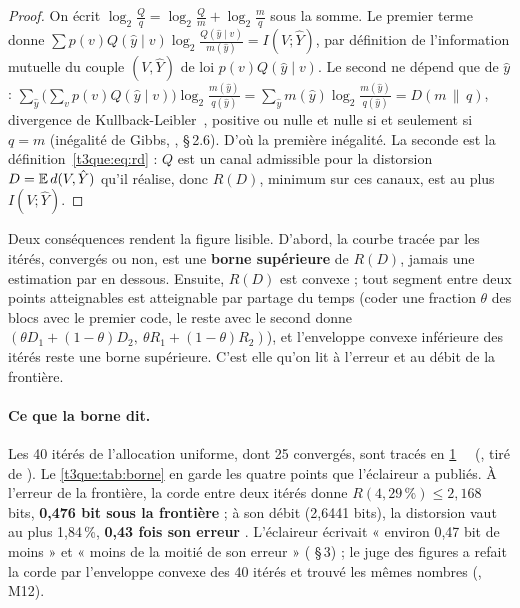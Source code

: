 \begin{proof}
On écrit $\log_2 \frac{Q}{q} = \log_2 \frac{Q}{m} + \log_2 \frac{m}{q}$ sous la somme. Le premier terme donne $\sum p(v) Q(\hat y\mid v) \log_2 \frac{Q(\hat y\mid v)}{m(\hat y)} = I(V ; \hat Y)$, par définition de l'information mutuelle du couple $(V, \hat Y)$ de loi $p(v) Q(\hat y \mid v)$. Le second ne dépend que de $\hat y$ : $\sum_{\hat y} \bigl(\sum_v p(v) Q(\hat y\mid v)\bigr) \log_2 \frac{m(\hat y)}{q(\hat y)} = \sum_{\hat y} m(\hat y) \log_2 \frac{m(\hat y)}{q(\hat y)} = D(m \,\|\, q)$, divergence de Kullback-Leibler~\cite{kullback1951}, positive ou nulle et nulle si et seulement si $q = m$ (inégalité de Gibbs, \cite{cover2006}, §\,2.6). D'où la première inégalité. La seconde est la définition~\eqref{t3que:eq:rd} : $Q$ est un canal admissible pour la distorsion $D = \mathbb{E}\, d(V, \hat Y)$ qu'il réalise, donc $R(D)$, minimum sur ces canaux, est au plus $I(V ; \hat Y)$.
\end{proof}

Deux conséquences rendent la figure lisible. D'abord, la courbe tracée par les itérés, convergés ou non, est une \textbf{borne supérieure} de $R(D)$, jamais une estimation par en dessous. Ensuite, $R(D)$ est convexe ; tout segment entre deux points atteignables est atteignable par partage du temps (coder une fraction $\theta$ des blocs avec le premier code, le reste avec le second donne $(\theta D_1 + (1-\theta) D_2,\ \theta R_1 + (1-\theta) R_2)$), et l'enveloppe convexe inférieure des itérés reste une borne supérieure. C'est elle qu'on lit à l'erreur et au débit de la frontière.

\begin{figure}[tbp]
\centering
\GrapheEclBorne
{}
\label{fig:t3-ecl-borne}
\end{figure}

\paragraph{Ce que la borne dit.} Les 40 itérés de l'allocation uniforme, dont 25 convergés, sont tracés en \cref{fig:t3-ecl-borne} \mes~\calc~(, tiré de ). Le \cref{t3que:tab:borne} en garde les quatre points que l'éclaireur a publiés. À l'erreur de la frontière, la corde entre deux itérés donne $R(4{,}29\,\%) \le 2{,}168$ bits, \textbf{0,476 bit sous la frontière} ; à son débit (2,6441 bits), la distorsion vaut au plus 1,84\,\%, \textbf{0,43 fois son erreur} \calc. L'éclaireur écrivait « environ 0,47 bit de moins » et « moins de la moitié de son erreur » ( §\,3) ; le juge des figures a refait la corde par l'enveloppe convexe des 40 itérés et trouvé les mêmes nombres (, M12).

